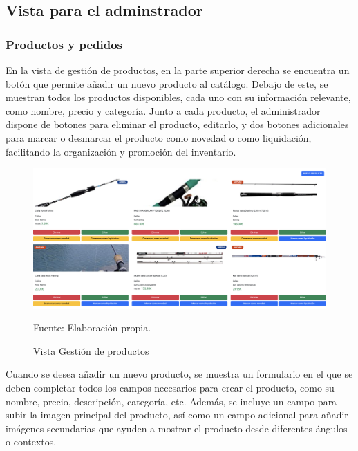 \subsection{Vista para el adminstrador}\label{subsec5.1.2}

\subsubsection{Productos y pedidos}\label{subsec5.1.2.1}
En la vista de gestión de productos, en la parte superior derecha se encuentra un botón que permite añadir un nuevo producto al catálogo. Debajo de este, se muestran todos los productos disponibles, cada uno con su información relevante, como nombre, precio y categoría. Junto a cada producto, el administrador dispone de botones para eliminar el producto, editarlo, y dos botones adicionales para marcar o desmarcar el producto como novedad o como liquidación, facilitando la organización y promoción del inventario.

\begin{figure}[H]
\begin{center}
\includegraphics[scale=0.35]{./Images/vistaAdminProductos.png}
\caption{Vista Gestión de productos} Fuente: Elaboración propia.

\label{fig:fig1}

\end{center}
\end{figure}

Cuando se desea añadir un nuevo producto, se muestra un formulario en el que se deben completar todos los campos necesarios para crear el producto, como su nombre, precio, descripción, categoría, etc. Además, se incluye un campo para subir la imagen principal del producto, así como un campo adicional para añadir imágenes secundarias que ayuden a mostrar el producto desde diferentes ángulos o contextos.

